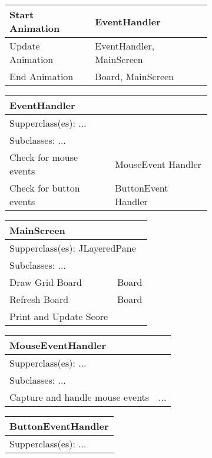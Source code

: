 \begin{figure}[H]
\begin{subfigure}{}
\begin{tabular}{|p{1in}|p{1in}|}
			Start Animation & EventHandler \\ \hline
			Update Animation & EventHandler, MainScreen \\ \hline
			End Animation & Board, MainScreen \\ \hline
		\end{tabular}
\end{subfigure}
\begin{subfigure}{}
		\begin{tabular}{|p{1in}|p{1in}|}
			\hline
			\multicolumn{2}{|p{2in}|}{\textbf{EventHandler}} \\ \hline
			\multicolumn{2}{|p{2in}|}{Supperclass(es): ...} \\ \hline
			\multicolumn{2}{|p{2in}|}{Subclasses: ...} \\ \hline
			Check for mouse events & MouseEvent Handler \\ \hline
			Check for button events & ButtonEvent Handler \\ \hline
		\end{tabular}
		\begin{tabular}{|p{1in}|p{1in}|}
			\hline
			\multicolumn{2}{|p{2in}|}{\textbf{MainScreen}} \\ \hline
			\multicolumn{2}{|p{2in}|}{Supperclass(es): JLayeredPane} \\ \hline
			\multicolumn{2}{|p{2in}|}{Subclasses: ...} \\ \hline
			Draw Grid Board & Board \\ \hline
			Refresh Board & Board \\ \hline
			Print and Update Score &  \\ \hline
		\end{tabular}
\end{subfigure}
\begin{subfigure}{}
		\begin{tabular}{|p{1in}|p{1in}|}
			\hline
			\multicolumn{2}{|p{2in}|}{\textbf{MouseEventHandler}} \\ \hline
			\multicolumn{2}{|p{2in}|}{Supperclass(es): ...} \\ \hline
			\multicolumn{2}{|p{2in}|}{Subclasses: ...} \\ \hline
			Capture and handle mouse events & ... \\ \hline
		\end{tabular}
		\begin{tabular}{|p{1in}|p{1in}|}
			\hline
			\multicolumn{2}{|p{2in}|}{\textbf{ButtonEventHandler}} \\ \hline
			\multicolumn{2}{|p{2in}|}{Supperclass(es): ...} \\ \hline

\end{tabular}
\end{subfigure}
\end{figure}
